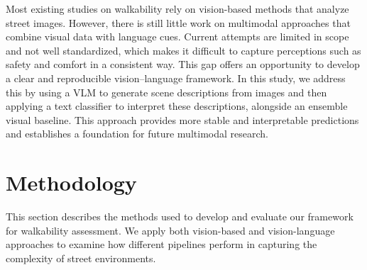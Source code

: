 \documentclass[11pt]{article}
\begin{document}
Most existing studies on walkability rely on vision-based methods that analyze street images. However, there is still little work on multimodal approaches that combine visual data with language cues. Current attempts are limited in scope and not well standardized, which makes it difficult to capture perceptions such as safety and comfort in a consistent way. This gap offers an opportunity to develop a clear and reproducible vision–language framework. In this study, we address this by using a VLM to generate scene descriptions from images and then applying a text classifier to interpret these descriptions, alongside an ensemble visual baseline. This approach provides more stable and interpretable predictions and establishes a foundation for future multimodal research.



\section{Methodology}

This section describes the methods used to develop and evaluate our framework for walkability assessment. We apply both vision-based and vision-language approaches to examine how different pipelines perform in capturing the complexity of street environments.
\end{document}
